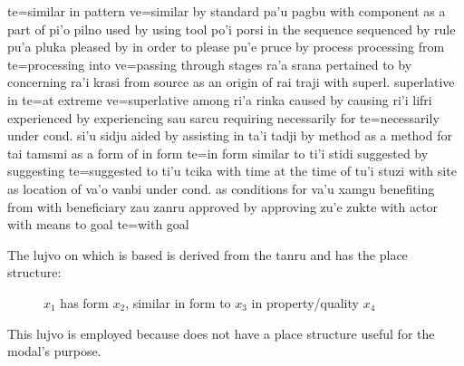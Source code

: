             te=similar in pattern
                    ve=similar by standard
    pa'u    pagbu   with component  as a part of
    pi'o    pilno   used by     using tool
    po'i    porsi   in the sequence sequenced by rule
    pu'a    pluka   pleased by  in order to please
    pu'e    pruce   by process  processing from
            te=processing into
                    ve=passing through stages
    ra'a    srana   pertained to by concerning
    ra'i    krasi   from source as an origin of
    rai traji   with superl.    superlative in
            te=at extreme   ve=superlative among
    ri'a    rinka   caused by   causing
    ri'i    lifri   experienced by  experiencing
    sau sarcu   requiring   necessarily for
            te=necessarily under cond.
    si'u    sidju   aided by    assisting in
    ta'i    tadji   by method   as a method for
    tai tamsmi  as a form of    in form
            te=in form similar to
    ti'i    stidi   suggested by    suggesting
            te=suggested to
    ti'u    tcika   with time   at the time of
    tu'i    stuzi   with site   as location of
    va'o    vanbi   under cond. as conditions for
    va'u    xamgu   benefiting from with beneficiary
    zau zanru   approved by approving
    zu'e    zukte   with actor  with means to goal
            te=with goal

The lujvo  on which  is based is derived
    from the tanru  and has the place structure:
\begin{description}
\item[] $x_1$ has form $x_2$, similar in form to $x_3$ in property/quality $x_4$

\end{description}

This lujvo is employed because  does not have a
    place structure useful for the modal's purpose.
